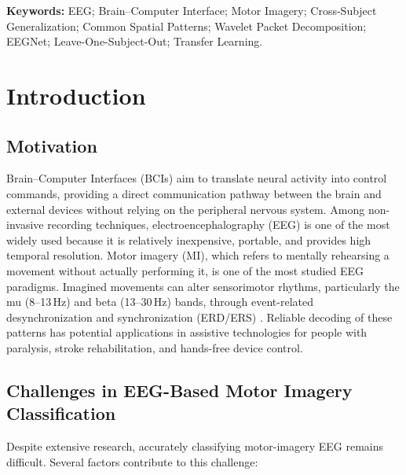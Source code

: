 \documentclass[11pt,a4paper]{article}
\begin{document}
	\vspace{0.45cm}
	
	\noindent
	\textbf{Keywords:}
	EEG; Brain--Computer Interface; Motor Imagery;
	Cross-Subject Generalization; Common Spatial Patterns;
	Wavelet Packet Decomposition; EEGNet;
	Leave-One-Subject-Out; Transfer Learning.
	
	\newpage
	\tableofcontents
	\newpage

	\section{Introduction}
	
	\subsection{Motivation}
	
	Brain--Computer Interfaces (BCIs) aim to translate neural activity into control commands,
	providing a direct communication pathway between the brain and external devices without
	relying on the peripheral nervous system. Among non-invasive recording techniques,
	electroencephalography (EEG) is one of the most widely used because it is relatively
	inexpensive, portable, and provides high temporal resolution. Motor imagery (MI), which
	refers to mentally rehearsing a movement without actually performing it, is one of the most
	studied EEG paradigms. Imagined movements can alter sensorimotor rhythms, particularly the
	mu (8--13\,Hz) and beta (13--30\,Hz) bands, through event-related desynchronization and
	synchronization (ERD/ERS) \cite{pfurtscheller1999}. Reliable decoding of these patterns
	has potential applications in assistive technologies for people with paralysis, stroke
	rehabilitation, and hands-free device control.
	
	\subsection{Challenges in EEG-Based Motor Imagery Classification}
	
	Despite extensive research, accurately classifying motor-imagery EEG remains difficult.
	Several factors contribute to this challenge:
	
\end{document}
